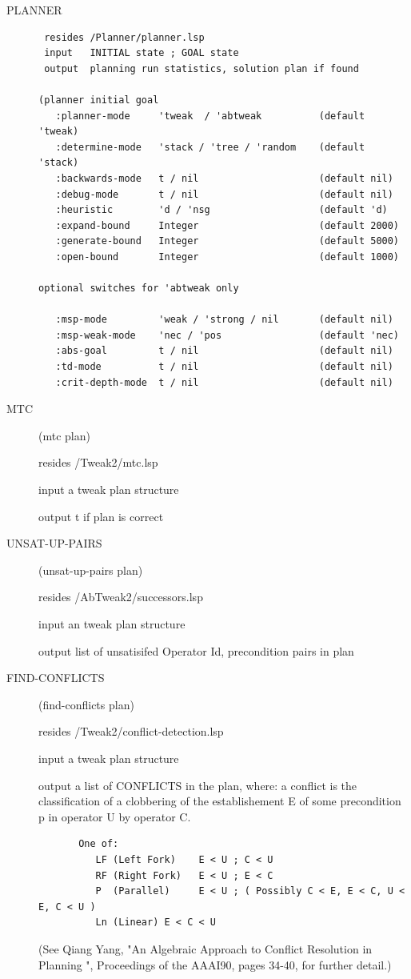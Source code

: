 \begin{description}

\item[PLANNER]

\begin{verbatim}
 resides /Planner/planner.lsp
 input   INITIAL state ; GOAL state
 output  planning run statistics, solution plan if found

(planner initial goal
   :planner-mode     'tweak  / 'abtweak          (default 'tweak)
   :determine-mode   'stack / 'tree / 'random    (default 'stack)
   :backwards-mode   t / nil                     (default nil)
   :debug-mode       t / nil                     (default nil)
   :heuristic        'd / 'nsg                   (default 'd)
   :expand-bound     Integer                     (default 2000)
   :generate-bound   Integer                     (default 5000)
   :open-bound       Integer                     (default 1000)

optional switches for 'abtweak only

   :msp-mode         'weak / 'strong / nil       (default nil)
   :msp-weak-mode    'nec / 'pos                 (default 'nec)
   :abs-goal         t / nil                     (default nil)
   :td-mode          t / nil                     (default nil)
   :crit-depth-mode  t / nil                     (default nil)
\end{verbatim}

\item[MTC]
 (mtc plan)

 resides /Tweak2/mtc.lsp

 input   a tweak plan structure

 output  t if plan is correct


\item[UNSAT-UP-PAIRS] (unsat-up-pairs plan)

 resides /AbTweak2/successors.lsp

 input   an tweak  plan structure

 output  list of unsatisifed Operator Id, precondition pairs in plan

\item[FIND-CONFLICTS] (find-conflicts plan)

 resides /Tweak2/conflict-detection.lsp

 input  a tweak plan structure

 output a list of CONFLICTS in the plan, where:
a conflict is the classification of a clobbering of the
establishement E of some precondition p in operator U by operator C.
\begin{verbatim}
       One of:
          LF (Left Fork)    E < U ; C < U
          RF (Right Fork)   E < U ; E < C
          P  (Parallel)     E < U ; ( Possibly C < E, E < C, U < E, C < U )
          Ln (Linear) E < C < U 
\end{verbatim}
(See Qiang Yang, "An Algebraic Approach to Conflict Resolution in
Planning ", Proceedings of the AAAI90, pages 34-40,  for further detail.)




\end{description}

